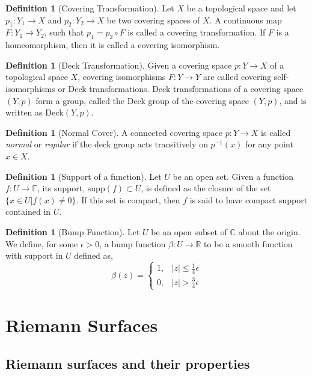 \documentclass[11pt]{report}
\theoremstyle{definition}
\newtheorem{defn}[thm]{Definition}
\begin{document}
\begin{defn}[Covering Transformation]
  Let $X$ be a topological space and let $p_1:Y_1 \rightarrow X$ and $p_2:Y_2 \rightarrow X$ be two covering spaces of $X$. A continuous map $F:Y_1 \rightarrow Y_2$, such that $p_1 = p_2 \circ F$ is called a covering transformation. If $F$ is a homeomorphism, then it is called a covering isomorphism.
\end{defn}
\begin{defn}[Deck Transformation]
  Given a covering space $p:Y \rightarrow X$ of a topological space $X$,  covering isomorphisms $F:Y \rightarrow Y$ are called covering self-isomorphisms or Deck transformations. Deck transformations of a covering space $(Y,p)$ form a group, called the Deck group of the covering space $(Y,p)$, and is written as $\text{Deck}(Y,p)$.
\end{defn}
\begin{defn}[Normal Cover]
A connected covering space $p:Y \rightarrow X$ is called \emph{normal} or \emph{regular} if the deck group acts transitively on $p^{-1}(x)$ for any point $x \in X$.
\end{defn}

\begin{defn}[Support of a function]
Let $U$ be an open set. Given a function $f: U \rightarrow \mathbb{F}$, its support, $\text{supp}(f) \subset U$, is defined as the closure of the set $\{x \in U \vert f(x)\neq 0\}$. If this set is compact, then $f$ is said to have compact support contained in $U$.
\end{defn}
\begin{defn}[Bump Function]
  Let $U$ be an open subset of $\mathbb{C}$ about the origin. We define, for some $\epsilon > 0$, a bump function $\beta: U \rightarrow \mathbb{R}$ to be a smooth function with support in $U$ defined as,
  \[
    \beta(z)=
    \begin{cases}
      1, &|z| \leq \frac{1}{4}\epsilon \\
      0, &|z| > \frac{3}{4}\epsilon
    \end{cases}
  \]
\end{defn}


\chapter{Riemann Surfaces}

\section{Riemann surfaces and their properties}\label{bdefns}
\end{document}

